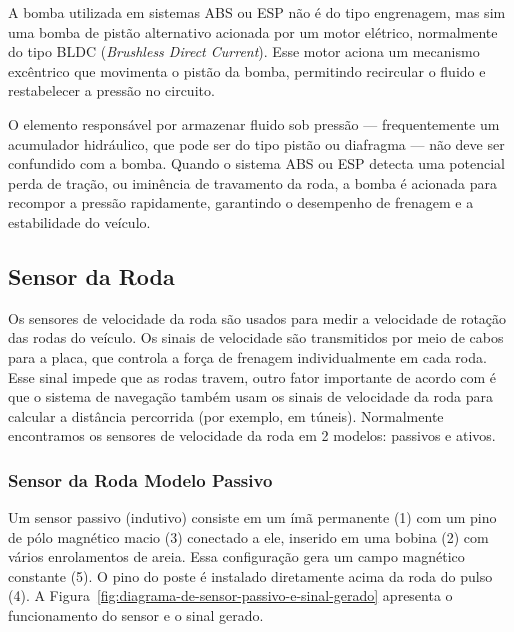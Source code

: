 
A bomba utilizada em sistemas ABS ou ESP não é do tipo engrenagem, mas sim uma bomba de pistão alternativo acionada por um motor elétrico, normalmente do tipo BLDC (\textit{Brushless Direct Current}). Esse motor aciona um mecanismo excêntrico que movimenta o pistão da bomba, permitindo recircular o fluido e restabelecer a pressão no circuito. 

O elemento responsável por armazenar fluido sob pressão — frequentemente um acumulador hidráulico, que pode ser do tipo pistão ou diafragma — não deve ser confundido com a bomba. Quando o sistema ABS ou ESP detecta uma potencial perda de tração, ou iminência de travamento da roda, a bomba é acionada para recompor a pressão rapidamente, garantindo o desempenho de frenagem e a estabilidade do veículo.


\subsection{Sensor da Roda}
\label{sec:metodologia-4-3}

Os sensores de velocidade da roda são usados para medir a velocidade de rotação das rodas do veículo. Os sinais de velocidade são transmitidos por meio de cabos para a placa, que controla a força de frenagem individualmente em cada roda. Esse sinal impede que as rodas travem, outro fator importante de acordo com  é que o sistema de navegação também usam os sinais de velocidade da roda para calcular a distância percorrida (por exemplo, em túneis). Normalmente encontramos os sensores de velocidade da roda em 2 modelos: passivos e ativos. 

\subsubsection{Sensor da Roda Modelo Passivo}
\label{sec:metodologia-4-3-1}

Um sensor passivo (indutivo) consiste em um ímã permanente (1) com um pino de pólo magnético macio (3) conectado a ele, inserido em uma bobina (2) com vários enrolamentos de areia. Essa configuração gera um campo magnético constante (5). O pino do poste é instalado diretamente acima da roda do pulso (4). A Figura~\ref{fig:diagrama-de-sensor-passivo-e-sinal-gerado} apresenta o funcionamento do sensor e o sinal gerado.

